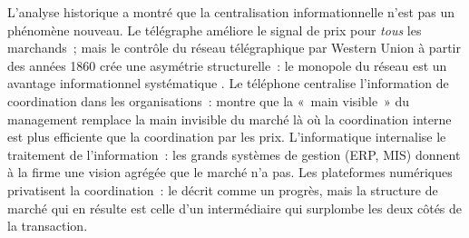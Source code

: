 L'analyse historique a montré que la centralisation informationnelle n'est pas un phénomène nouveau. Le télégraphe améliore le signal de prix pour \emph{tous} les marchands~; mais le contrôle du réseau télégraphique par Western Union à partir des années 1860 crée une asymétrie structurelle~: le monopole du réseau est un avantage informationnel systématique \parencite{wu2010master}. Le téléphone centralise l'information de coordination dans les organisations~: \textcite{chandler_visible_1977} montre que la «~main visible~» du management remplace la main invisible du marché là où la coordination interne est plus efficiente que la coordination par les prix. L'informatique internalise le traitement de l'information~: les grands systèmes de gestion (ERP, MIS) donnent à la firme une vision agrégée que le marché n'a pas. Les plateformes numériques privatisent la coordination~: \textcite{varian_computer_2010} le décrit comme un progrès, mais la structure de marché qui en résulte est celle d'un intermédiaire qui surplombe les deux côtés de la transaction.


